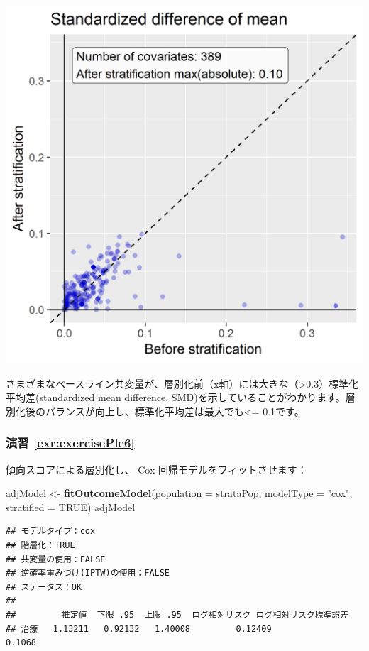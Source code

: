 \documentclass[
  11pt]{book}
\newenvironment{Shaded}{\begin{snugshade}}{\end{snugshade}}
\newcommand{\AttributeTok}[1]{\textcolor[rgb]{0.13,0.29,0.53}{#1}}
\newcommand{\ConstantTok}[1]{\textcolor[rgb]{0.56,0.35,0.01}{#1}}
\newcommand{\FunctionTok}[1]{\textcolor[rgb]{0.13,0.29,0.53}{\textbf{#1}}}
\newcommand{\NormalTok}[1]{#1}
\newcommand{\OtherTok}[1]{\textcolor[rgb]{0.56,0.35,0.01}{#1}}
\newcommand{\StringTok}[1]{\textcolor[rgb]{0.31,0.60,0.02}{#1}}
\theoremstyle{definition}
\theoremstyle{definition}
\theoremstyle{definition}
\theoremstyle{definition}
\theoremstyle{remark}
\begin{document}
\begin{center}\includegraphics[width=0.7\linewidth]{images/SuggestedAnswers/scatter} \end{center}

さまざまなベースライン共変量が、層別化前（x軸）には大きな（\textgreater0.3）標準化平均差(standardized mean difference, SMD)を示していることがわかります。層別化後のバランスが向上し、標準化平均差は最大でも\textless= 0.1です。

\subsubsection*{演習 \ref{exr:exercisePle6}}\label{ux6f14ux7fd2-refexrexerciseple6}

傾向スコアによる層別化し、 Cox 回帰モデルをフィットさせます：

\begin{Shaded}
\begin{Highlighting}[]
\NormalTok{adjModel }\OtherTok{\textless{}{-}} \FunctionTok{fitOutcomeModel}\NormalTok{(}\AttributeTok{population =}\NormalTok{ strataPop,}
                         \AttributeTok{modelType =} \StringTok{"cox"}\NormalTok{,}
                         \AttributeTok{stratified =} \ConstantTok{TRUE}\NormalTok{)}
\NormalTok{adjModel}
\end{Highlighting}
\end{Shaded}

\begin{verbatim}
## モデルタイプ：cox
## 階層化：TRUE
## 共変量の使用：FALSE
## 逆確率重みづけ(IPTW)の使用：FALSE
## ステータス：OK
## 
##         推定値  下限 .95  上限 .95  ログ相対リスク ログ相対リスク標準誤差
## 治療   1.13211   0.92132   1.40008         0.12409                 0.1068
\end{verbatim}
\end{document}
